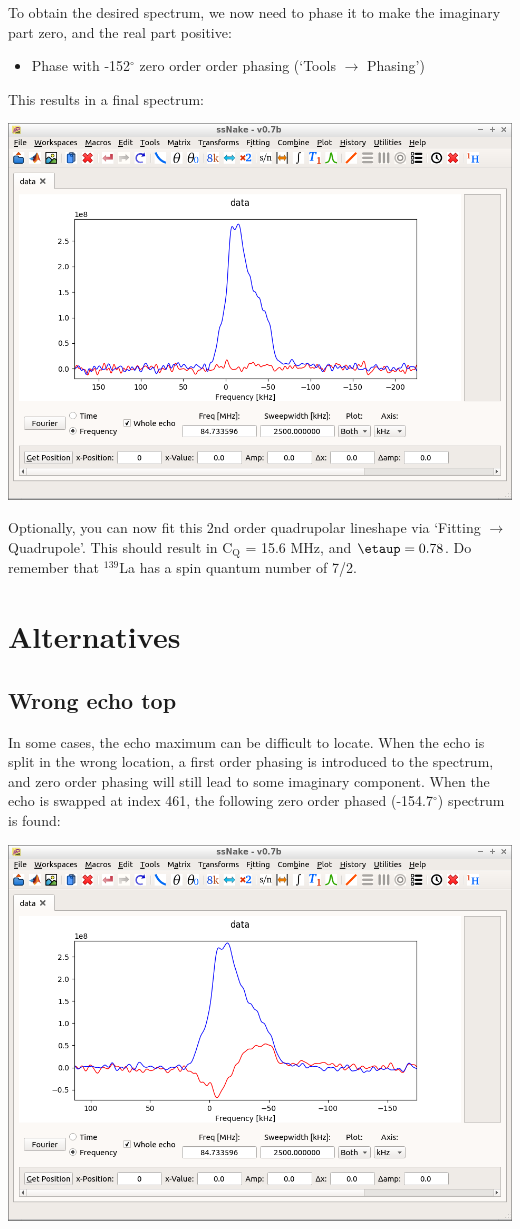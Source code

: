 \documentclass[11pt,a4paper]{article}
\begin{document}
To obtain the desired spectrum, we now need to phase it to make the imaginary part zero, and the real part positive:
\begin{itemize}
\item Phase with -152$^\circ$ zero order order phasing (`Tools $\longrightarrow$ Phasing')
\end{itemize}
This results in a final spectrum:
\begin{center}
\includegraphics[width=0.8\linewidth]{Figs/Fig4.png}
\end{center}

Optionally, you can now fit this 2nd order quadrupolar lineshape via `Fitting $\longrightarrow$ Quadrupole'.
This should result in C$_\text{Q}$ = 15.6 MHz, and $\etaup = 0.78$.
Do remember that $^{139}$La has a spin quantum number of 7/2.

\section{Alternatives}
\subsection{Wrong echo top}
In some cases, the echo maximum can be difficult to locate.
When the echo is split in the wrong location, a first order phasing is introduced to the spectrum, and zero order phasing  will still lead to some imaginary component.
When the echo is swapped at index 461, the following zero order phased (-154.7$^\circ$) spectrum is found:
\begin{center}
\includegraphics[width=0.8\linewidth]{Figs/Fig5.png}
\end{center}
\end{document}
